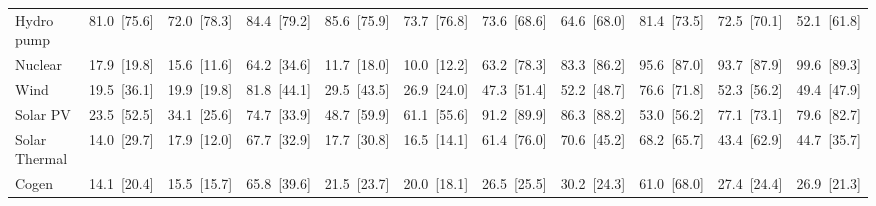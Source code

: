 \begin{tabular}{@{}l r r r r r  r r r r r @{}}
Hydro pump & 81.0~{\color{seasoncol}\scriptsize[75.6]} & 72.0~{\color{seasoncol}\scriptsize[78.3]} & 84.4~{\color{seasoncol}\scriptsize[79.2]} & 85.6~{\color{seasoncol}\scriptsize[75.9]} & 73.7~{\color{seasoncol}\scriptsize[76.8]} & 73.6~{\color{seasoncol}\scriptsize[68.6]} & 64.6~{\color{seasoncol}\scriptsize[68.0]} & 81.4~{\color{seasoncol}\scriptsize[73.5]} & 72.5~{\color{seasoncol}\scriptsize[70.1]} & 52.1~{\color{seasoncol}\scriptsize[61.8]} \\
Nuclear & 17.9~{\color{seasoncol}\scriptsize[19.8]} & 15.6~{\color{seasoncol}\scriptsize[11.6]} & 64.2~{\color{seasoncol}\scriptsize[34.6]} & 11.7~{\color{seasoncol}\scriptsize[18.0]} & 10.0~{\color{seasoncol}\scriptsize[12.2]} & 63.2~{\color{seasoncol}\scriptsize[78.3]} & 83.3~{\color{seasoncol}\scriptsize[86.2]} & 95.6~{\color{seasoncol}\scriptsize[87.0]} & 93.7~{\color{seasoncol}\scriptsize[87.9]} & 99.6~{\color{seasoncol}\scriptsize[89.3]} \\
Wind & 19.5~{\color{seasoncol}\scriptsize[36.1]} & 19.9~{\color{seasoncol}\scriptsize[19.8]} & 81.8~{\color{seasoncol}\scriptsize[44.1]} & 29.5~{\color{seasoncol}\scriptsize[43.5]} & 26.9~{\color{seasoncol}\scriptsize[24.0]} & 47.3~{\color{seasoncol}\scriptsize[51.4]} & 52.2~{\color{seasoncol}\scriptsize[48.7]} & 76.6~{\color{seasoncol}\scriptsize[71.8]} & 52.3~{\color{seasoncol}\scriptsize[56.2]} & 49.4~{\color{seasoncol}\scriptsize[47.9]} \\
Solar PV & 23.5~{\color{seasoncol}\scriptsize[52.5]} & 34.1~{\color{seasoncol}\scriptsize[25.6]} & 74.7~{\color{seasoncol}\scriptsize[33.9]} & 48.7~{\color{seasoncol}\scriptsize[59.9]} & 61.1~{\color{seasoncol}\scriptsize[55.6]} & 91.2~{\color{seasoncol}\scriptsize[89.9]} & 86.3~{\color{seasoncol}\scriptsize[88.2]} & 53.0~{\color{seasoncol}\scriptsize[56.2]} & 77.1~{\color{seasoncol}\scriptsize[73.1]} & 79.6~{\color{seasoncol}\scriptsize[82.7]} \\
Solar Thermal & 14.0~{\color{seasoncol}\scriptsize[29.7]} & 17.9~{\color{seasoncol}\scriptsize[12.0]} & 67.7~{\color{seasoncol}\scriptsize[32.9]} & 17.7~{\color{seasoncol}\scriptsize[30.8]} & 16.5~{\color{seasoncol}\scriptsize[14.1]} & 61.4~{\color{seasoncol}\scriptsize[76.0]} & 70.6~{\color{seasoncol}\scriptsize[45.2]} & 68.2~{\color{seasoncol}\scriptsize[65.7]} & 43.4~{\color{seasoncol}\scriptsize[62.9]} & 44.7~{\color{seasoncol}\scriptsize[35.7]} \\
Cogen & 14.1~{\color{seasoncol}\scriptsize[20.4]} & 15.5~{\color{seasoncol}\scriptsize[15.7]} & 65.8~{\color{seasoncol}\scriptsize[39.6]} & 21.5~{\color{seasoncol}\scriptsize[23.7]} & 20.0~{\color{seasoncol}\scriptsize[18.1]} & 26.5~{\color{seasoncol}\scriptsize[25.5]} & 30.2~{\color{seasoncol}\scriptsize[24.3]} & 61.0~{\color{seasoncol}\scriptsize[68.0]} & 27.4~{\color{seasoncol}\scriptsize[24.4]} & 26.9~{\color{seasoncol}\scriptsize[21.3]} \\

\end{tabular}
